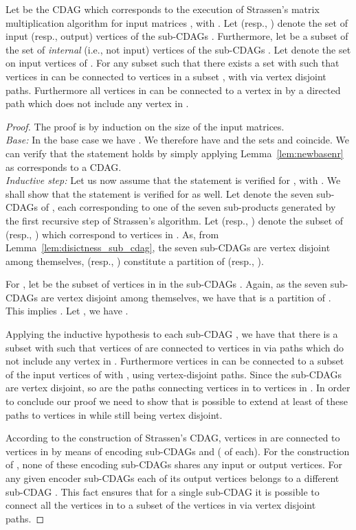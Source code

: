 \documentclass[a4paper,UKenglish]{lipics-v2016}
\begin{document}
\begin{lemma}\label{lem:stra_part1}
Let  be the CDAG which corresponds to the execution of Strassen's matrix multiplication algorithm for input matrices , with . Let  (resp., ) denote the set of input (resp., output) vertices of the  sub-CDAGs . Furthermore, let  be a subset of the set of \emph{internal} (i.e., not input) vertices of the sub-CDAGs . Let  denote the set on input vertices of . For any subset  such that  there exists a set  with  such that  vertices in  can be connected to vertices in a subset , with  via vertex disjoint paths. Furthermore all vertices in  can be connected to a vertex in  by a directed path which does not include any vertex in .
\end{lemma}
\begin{proof}
	The proof is by induction on the size of the input matrices.\\
\emph{Base:} In the base case we have . We therefore
have  and the sets
 and  coincide. We can verify that the
statement holds by simply applying Lemma~\ref{lem:newbasenr} as
 corresponds to a  CDAG.\\
\emph{Inductive step:} Let us now assume that the statement is
verified for , with . We shall show
that the statement is verified for  as well.  Let
 denote the
seven sub-CDAGs of , each corresponding to one of the
seven sub-products generated by the first recursive step of Strassen's
algorithm. Let  (resp., ) denote the subset of 
(resp., ) which correspond to vertices in . As, from Lemma~\ref{lem:disictness_sub_cdag}, the seven
sub-CDAGs  are vertex disjoint among themselves,
 (resp., ) constitute a partition of  (resp., ).

For , let  be the subset of vertices in  in the sub-CDAGs . Again, as the seven sub-CDAGs  are vertex disjoint among themselves, we have that  is a partition of .  This implies . Let , we have . 
	
	Applying the inductive hypothesis to each sub-CDAG , we have that there is a subset  with  such that vertices of  are connected  to vertices in  via paths which do not include any vertex in . Furthermore vertices in  can be connected to a subset  of the input vertices of  with , using vertex-disjoint paths. Since the sub-CDAGs  are vertex disjoint, so are the paths connecting vertices in  to vertices in . In order to conclude our proof we need to show that is possible to extend at least  of these paths to vertices in  while still being vertex disjoint. 
	
	According to the construction of Strassen's CDAG, vertices in   are connected to vertices in  by means of  encoding sub-CDAGs  and  ( of each). For the construction of , none of these encoding sub-CDAGs shares any input or output vertices. For any given encoder sub-CDAGs each of its output vertices belongs to a different sub-CDAG . This fact ensures that for a single sub-CDAG  it is possible to connect all the vertices in  to a subset of the vertices in  via vertex disjoint paths.
	

\end{proof}
\end{document}
